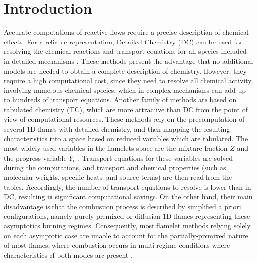 \documentclass[preprint,12pt,authoryear]{elsarticle}
\begin{document}

\clearpage


\printnomenclature










\clearpage

\section{Introduction}
\label{sec:intro}
%

Accurate computations of reactive flows require a precise  description of chemical effects. For a reliable representation, Detailed Chemistry (DC) can be used for resolving the chemical reactions and transport equations for all species included in detailed mechanisms \citep{poinsot_theoretical_2005}. These methods present the advantage that no additional models are needed to obtain a complete description of chemistry. However, they require a high computational cost, since they need to resolve all chemical activity involving numerous chemical species, which in complex mechanisms can add up to hundreds of transport equations. Another family of methods are based on tabulated chemistry (TC), which are more attractive than DC from the point of view of computational resources. These methods rely on the precomputation of several 1D flames with detailed chemistry, and then mapping the resulting characteristics into a space based on reduced variables which are tabulated. The most widely used variables in the flamelets space are the mixture fraction $Z$ and the progress variable $Y_c$ \citep{janicka_calculation_1982}. Transport equations for these variables are solved during the computations, and transport and chemical properties (such as molecular weights, specific heats, and source terms) are then read from the tables. Accordingly, the number of transport equations to resolve is lower than in DC, resulting in significant computational savings. On the other hand, their main disadvantage is that the combustion process is described by simplified a priori configurations, namely purely premixed or diffusion 1D flames representing these asymptotics burning regimes. Consequently, most flamelet methods relying solely on each asymptotic case are unable to account for the partially-premixed nature of most flames, where combustion occurs in multi-regime conditions where characteristics of both modes are present \citep{masri_partial_2015}. 
\end{document}

